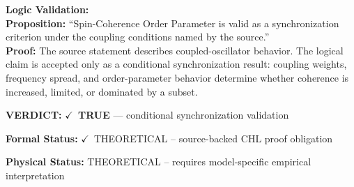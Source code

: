 \textbf{Logic Validation:}\\
\textbf{Proposition:} ``Spin-Coherence Order Parameter is valid as a synchronization criterion under the
coupling conditions named by the source.''\\
\textbf{Proof:} The source statement describes coupled-oscillator behavior. The logical claim is
accepted only as a conditional synchronization result: coupling weights, frequency
spread, and order-parameter behavior determine whether coherence is increased, limited,
or dominated by a subset.

\textbf{VERDICT:} \ensuremath{\checkmark}\ \textbf{TRUE} --- conditional synchronization validation

\textbf{Formal Status:} \ensuremath{\checkmark}\ THEORETICAL -- source-backed CHL proof obligation

\textbf{Physical Status:} THEORETICAL -- requires model-specific empirical interpretation
\par\vspace{0.45em}
\par
\ifTZPDarkEdition
{}
\fi
\endgroup
\endgroup
